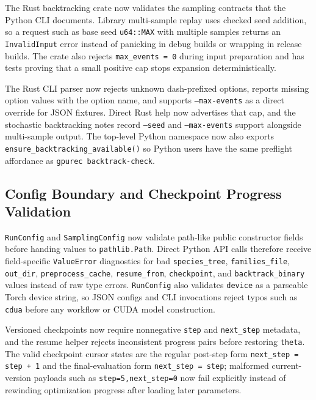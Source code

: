 \documentclass[11pt]{article}
\begin{document}
The Rust backtracking crate now validates the sampling contracts that the
Python CLI documents.  Library multi-sample replay uses checked seed addition,
so a request such as base seed \texttt{u64::MAX} with multiple samples returns
an \texttt{InvalidInput} error instead of panicking in debug builds or wrapping
in release builds.  The crate also rejects \texttt{max\_events = 0} during
input preparation and has tests proving that a small positive cap stops
expansion deterministically.

The Rust CLI parser now rejects unknown dash-prefixed options, reports missing
option values with the option name, and supports \texttt{--max-events} as a
direct override for JSON fixtures.  Direct Rust help now advertises that cap,
and the stochastic backtracking notes record \texttt{--seed} and
\texttt{--max-events} support alongside multi-sample output.  The top-level
Python namespace now also exports \texttt{ensure\_backtracking\_available()} so
Python users have the same preflight affordance as \texttt{gpurec
backtrack-check}.

\subsection{Config Boundary and Checkpoint Progress Validation}

\texttt{RunConfig} and \texttt{SamplingConfig} now validate path-like public
constructor fields before handing values to \texttt{pathlib.Path}.  Direct
Python API calls therefore receive field-specific \texttt{ValueError}
diagnostics for bad \texttt{species\_tree}, \texttt{families\_file},
\texttt{out\_dir}, \texttt{preprocess\_cache}, \texttt{resume\_from},
\texttt{checkpoint}, and \texttt{backtrack\_binary} values instead of raw
type errors.  \texttt{RunConfig} also validates \texttt{device} as a parseable
Torch device string, so JSON configs and CLI invocations reject typos such as
\texttt{cdua} before any workflow or CUDA model construction.

Versioned checkpoints now require nonnegative \texttt{step} and
\texttt{next\_step} metadata, and the resume helper rejects inconsistent
progress pairs before restoring \texttt{theta}.  The valid checkpoint cursor
states are the regular post-step form \texttt{next\_step = step + 1} and the
final-evaluation form \texttt{next\_step = step}; malformed current-version
payloads such as \texttt{step=5,next\_step=0} now fail explicitly instead of
rewinding optimization progress after loading later parameters.
\end{document}
